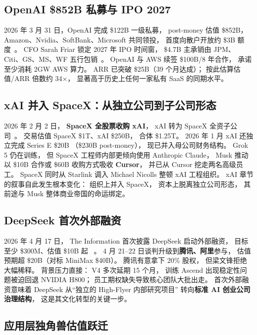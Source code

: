 \subsection{OpenAI \$852B 私募与 IPO 2027}

2026 年 3 月 31 日，OpenAI 完成 \$122B 一级私募，
post-money 估值 \$852B，
Amazon、Nvidia、SoftBank、Microsoft 共同领投，
首度向散户开放约 \$3B 额度~\cite{openai_852b_round_2026}。
CFO Sarah Friar 锁定 2027 年 IPO 时间窗，
\$4.7B 主承销由 JPM、Citi、GS、MS、WF 五行包销~\cite{openai_ipo_2027}。
OpenAI 与 AWS 续签 \$100B/8 年合作，
承诺至少消耗 2GW AWS 算力。
ARR 已突破 \$25B（39 个月达成）；
按此估算估值/ARR 倍数约 34$\times$，
显著高于历史上任何一家私有 SaaS 的同期水平。

\subsection{xAI 并入 SpaceX：从独立公司到子公司形态}

2026 年 2 月 2 日，
\textbf{SpaceX 全股票收购 xAI}，
xAI 转为 SpaceX 全资子公司~\cite{xai_spacex_merger_2026}。
交易估值 SpaceX \$1T、xAI \$250B，
合体 \$1.25T。
2026 年 1 月 xAI 还独立完成 Series E \$20B
（\$230B post-money），
现已并入母公司财务结构。
Grok 5 仍在训练，
但 SpaceX 工程师内部更倾向使用 Anthropic Claude，
Musk 推动以 \$10B 合作或 \$60B 收购方式吸收 \textbf{Cursor}，
并已从 Cursor 挖走两名高级员工。
SpaceX 同时从 Starlink 调入 Michael Nicolls 整顿 xAI 工程组织。
xAI 章节的叙事自此发生根本变化：
组织上并入 SpaceX，
资本上脱离独立公司形态，
其前途与 Musk 整体商业帝国的命运绑定。

\subsection{DeepSeek 首次外部融资}

2026 年 4 月 17 日，
The Information 首次披露 DeepSeek 启动外部融资，
目标至少 \$300M、估值 \$10B 起%
~\cite{deepseek_external_funding_2026}。
4 月 21--22 日谈判升级到\textbf{腾讯、阿里}参与，
估值预期超 \$20B（对标 MiniMax \$40B）。
腾讯有意拿下 20\% 股权，
但梁文锋拒绝大幅稀释。
背景压力直接：
V4 多次延期 15 个月，
训练 Ascend 出现稳定性问题被迫回退 NVIDIA H800；
员工期权缺失导致核心团队大批出走。
首次外部融资意味着 DeepSeek 从“独立的 High-Flyer 内部研究项目”
转向\textbf{标准 AI 创业公司治理结构}，
这是其文化转型的关键一步。

\subsection{应用层独角兽估值跃迁}

